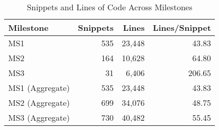 
\begin{table}[ht]
    \centering
    \caption{Snippets and Lines of Code Across Milestones}
    \label{tab:snippets_lines}
    \begin{tabular}{lrrr}
        \toprule
        \textbf{Milestone} & \textbf{Snippets} & \textbf{Lines} & \textbf{Lines/Snippet} \\
        \midrule
        MS1         & 535 & 23{,}448 & 43.83 \\
        MS2         & 164 & 10{,}628 & 64.80 \\
        MS3         & 31  & 6{,}406  & 206.65 \\
        MS1 (Aggregate)   & 535 & 23{,}448 & 43.83 \\
        MS2 (Aggregate)   & 699 & 34{,}076 & 48.75 \\
        MS3 (Aggregate)   & 730 & 40{,}482 & 55.45 \\
        \bottomrule
    \end{tabular}
\end{table}
